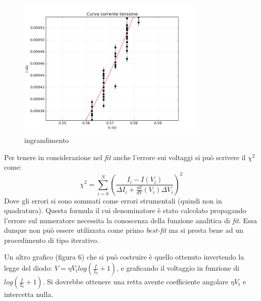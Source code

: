 \documentclass[a4paper,10pt]{article}
\begin{document}
\begin{figure}[!htb]
\begin{center}
\includegraphics[width=0.8\textwidth]{digitalizzatore.png}
\end{center}
\caption{ingrandimento}
\end{figure}

Per tenere in considerazione nel \emph{fit} anche l'errore sui voltaggi si può scrivere il $\chi^2$ come:
\begin{equation}
\chi^2 = \sum_{i=0}^N \left( \frac{I_i - I(V_i)}{\Delta I_i + \frac{dI}{dV}(V_i) \Delta V_i} \right) ^2
\end{equation}
Dove gli errori si sono sommati come errori strumentali (quindi non in quadratura). 
Questa formula il cui denominatore è stato calcolato propagando l'errore sul numeratore necessita la conoscenza della funzione analitica di \emph{fit}. Essa dunque non può essere utilizzata come primo \emph{best-fit} ma si presta bene ad un procedimento di tipo iterativo.


Un altro grafico (figura 6) che si può costruire è quello ottenuto invertendo la legge del diodo: $V = \eta V_t log(\frac{I}{I_0} + 1)$, e graficando  il voltaggio in funzione di $log(\frac{I}{I_0} + 1)$. Si dovrebbe ottenere una retta avente coefficiente angolare $\eta V_t$ e intercetta nulla.
\end{document}
